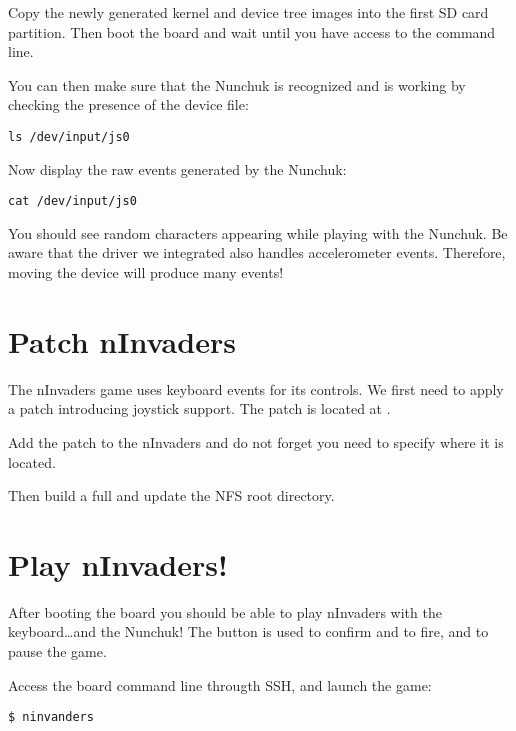 Copy the newly generated kernel and device tree images into the first SD card
partition. Then boot the board and wait until you have access to the
 command line.

You can then make sure that the Nunchuk is recognized and is working by
checking the presence of the  device file:
\begin{verbatim}
ls /dev/input/js0
\end{verbatim}

Now display the raw events generated by the Nunchuk:
\begin{verbatim}
cat /dev/input/js0
\end{verbatim}

You should see random characters appearing while playing with the Nunchuk. Be
aware that the driver we integrated also handles accelerometer events. Therefore,
moving the device will produce many events!

\section{Patch nInvaders}

The nInvaders game uses keyboard events for its controls. We first need to apply
a patch introducing joystick support. The patch is located at
.

Add the patch to the nInvaders  and do not forget you need to
specify where it is located.

Then build a full  and update the NFS root
directory.

\section{Play nInvaders!}

After booting the board you should be able to play nInvaders with the
keyboard\dots and the Nunchuk! The  button is used to confirm and to
fire, and  to pause the game.

Access the board command line througth SSH, and launch the game:
\begin{verbatim}
$ ninvanders
\end{verbatim}
